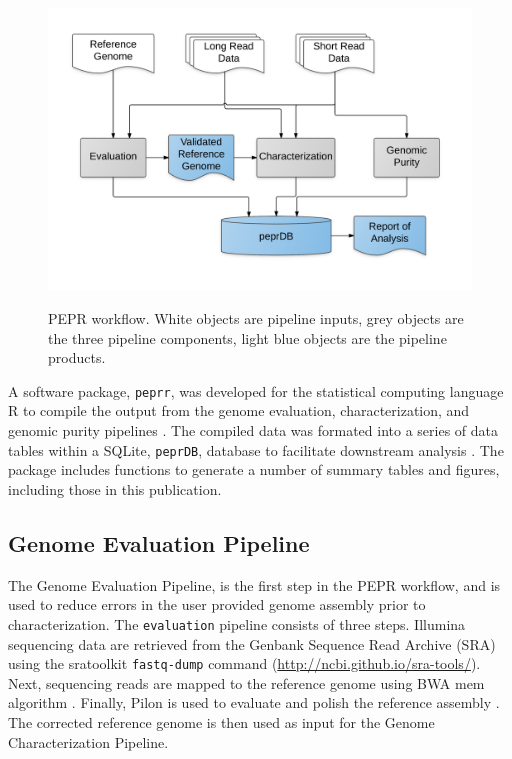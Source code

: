 \documentclass[smallextended]{svjour3}\usepackage[]{graphicx}\usepackage[]{color}
\begin{document}
\begin{figure}
\includegraphics[width=\textwidth]{pepr-workflow.png}
\label{fig:workflowFig}
\caption{PEPR workflow. White objects are pipeline inputs, grey objects are the three pipeline components, light blue objects are the pipeline products.}
\end{figure}

A software package, \texttt{peprr}, was developed for the statistical computing language R \cite{R2015} to compile the output from the genome evaluation, characterization, and genomic purity pipelines . The compiled data was formated into a series of data tables within a SQLite, \texttt{peprDB}, database to facilitate downstream analysis \cite{wickham2014tidy}.  The package includes functions to generate a number of summary tables and figures, including those in this publication.

\subsection{Genome Evaluation Pipeline}
\label{method:2}
The Genome Evaluation Pipeline, is the first step in the PEPR workflow, and is used to reduce errors in the user provided genome assembly prior to characterization. The \texttt{evaluation} pipeline consists of three steps.  Illumina sequencing data are retrieved from the Genbank Sequence Read Archive (SRA) using the sratoolkit \texttt{fastq-dump} command (\url{http://ncbi.github.io/sra-tools/}). Next, sequencing reads are mapped to the reference genome using BWA mem algorithm \cite{Li2013c}. Finally, Pilon is used to evaluate and polish the reference assembly \cite{Walker2014}. The corrected reference genome is then used as input for the Genome Characterization Pipeline.
\end{document}

